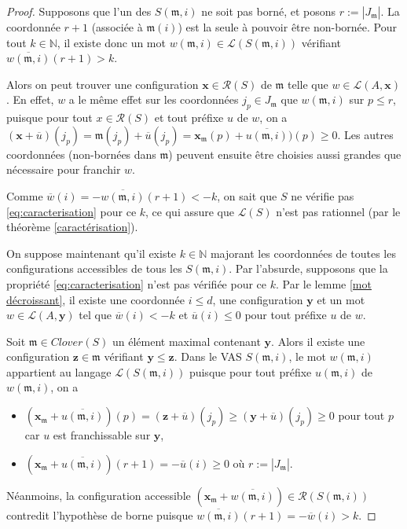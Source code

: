 \documentclass[a4paper,final]{article}
\theoremstyle{definition}
\let\leq\leqslant
\let\geq\geqslant
\newcommand{\N}{\ensuremath{\mathbb{N}}}
\newcommand{\card}[1]{|#1|}
\newcommand{\lang}{\ensuremath{\mathcal{L}}}
\newcommand{\reach}{\ensuremath{\mathcal{R}}}
\newcommand{\clover}{\textit{Clover}}
\newcommand{\vect}[1]{\ensuremath{\mathbf{#1}}}
\newcommand{\valeur}[1]{\ensuremath{\overline{#1}}}
\begin{document}
\begin{proof}
Supposons que l'un des $S(\mathfrak{m},i)$ ne soit pas borné, et posons $r:=\card{J_\mathfrak{m}}$.
La coordonnée $r+1$ (associée à $\mathfrak{m}(i)$) est la seule à pouvoir être non-bornée.
Pour tout $k\in\N$, il existe donc un mot $w(\mathfrak{m},i) \in \lang(S(\mathfrak{m},i))$ vérifiant $\valeur{w(\mathfrak{m},i)}(r+1) >k$.

Alors on peut trouver une configuration $\vect{x}\in\reach(S)$ de $\mathfrak{m}$ telle que $w\in\lang(A,\vect{x})$.
En effet, $w$ a le même effet sur les coordonnées $j_p \in J_\mathfrak{m}$ que $w(\mathfrak{m},i)$ sur $p\leq r$,
puisque pour tout $x\in\reach(S)$ et tout préfixe $u$ de $w$, on a
$(\vect{x} +\valeur{u})(j_p) = 
\mathfrak{m}(j_p) +\valeur{u}(j_p) = 
\vect{x}_\mathfrak{m}(p) +\valeur{u(\mathfrak{m},i)})(p) \geq 0$.
Les autres coordonnées (non-bornées dans $\mathfrak{m}$) peuvent ensuite être choisies aussi grandes que nécessaire pour franchir $w$.

Comme $\valeur{w}(i) = -\valeur{w(\mathfrak{m},i)}(r+1) < -k$, on sait que $S$ ne vérifie pas \eqref{eq:caracterisation} pour ce $k$, 
ce qui assure que $\lang(S)$ n'est pas rationnel (par le théorème \ref{caractérisation}).

\vspace{3mm}
On suppose maintenant qu'il existe $k\in\N$ majorant les coordonnées de toutes les configurations accessibles de tous les $S(\mathfrak{m},i)$.
Par l'absurde, supposons que la propriété \eqref{eq:caracterisation} n'est pas vérifiée pour ce $k$.
Par le lemme \ref{mot décroissant}, il existe une coordonnée $i\leq d$, une configuration $\vect{y}$ et un mot $w\in \lang(A,\vect{y})$ tel que  $\valeur{w}(i) < -k$ et $\valeur{u}(i) \leq 0$ pour tout préfixe $u$ de $w$.

Soit $\mathfrak{m} \in\clover(S)$ un élément maximal contenant $\vect{y}$.
Alors il existe une configuration $\vect{z}\in\mathfrak{m}$ vérifiant $\vect{y} \leq \vect{z}$.
Dans le VAS $S(\mathfrak{m},i)$, le mot $w(\mathfrak{m},i)$ appartient au langage $\lang(S(\mathfrak{m},i))$ 
puisque pour tout préfixe $u(\mathfrak{m},i)$ de $w(\mathfrak{m},i)$, on a 
\begin{itemize}
    \item $(\vect{x}_\mathfrak{m} +\valeur{u (\mathfrak{m},i)} )(p) = (\vect{z} +\valeur{u})(j_p) \geq (\vect{y} +\valeur{u})(j_p) \geq 0$ pour tout $p$ car $u$ est franchissable sur $\vect{y}$,
    \item $(\vect{x}_\mathfrak{m} +\valeur{u (\mathfrak{m},i)} )(r+1) = -\valeur{u}(i) \geq 0$ où $r:=\card{J_\mathfrak{m}}$.
\end{itemize}
Néanmoins, la configuration accessible $(\vect{x}_\mathfrak{m} + \valeur{w(\mathfrak{m},i)}) \in \reach(S(\mathfrak{m},i))$ contredit l'hypothèse de borne puisque $\valeur{w(\mathfrak{m},i)}(r+1) = -\valeur{w}(i) > k$.

\end{proof}
\end{document}
